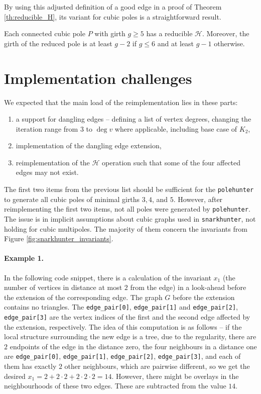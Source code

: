 By using this adjusted definition of a good edge in a proof of Theorem \ref{th:reducible_H}, its variant for cubic poles is a straightforward result.

\begin{corollary}
    Each connected cubic pole $P$ with girth $g\geq 5$ has a reducible $\mathcal H$. Moreover, the girth of the reduced pole is at least $g-2$ if $g\leq 6$ and at least $g-1$ otherwise.
\end{corollary}

\section{Implementation challenges}

We expected that the main load of the reimplementation lies in these parts:
\begin{enumerate}
    \item a support for dangling edges -- defining a list of vertex degrees, changing the iteration range from $3$ to $\deg v$ where applicable, including base case of $K_2$,
    \item implementation of the dangling edge extension,
    \item reimplementation of the $\mathcal H$ operation such that some of the four affected edges may not exist.
\end{enumerate}

The first two items from the previous list should be sufficient for the \texttt{polehunter} to generate all cubic poles of minimal girths $3, 4$, and $5$. However, after reimplementing the first two items, not all poles were generated by \texttt{polehunter}. The issue is in implicit assumptions about cubic graphs used in \texttt{snarkhunter}, not holding for cubic multipoles. The majority of them concern the invariants from Figure \ref{fig:snarkhunter_invariants}.

\paragraph{Example 1.} In the following code snippet, there is a calculation of the invariant $x_1$ (the number of vertices in distance at most $2$ from the edge) in a look-ahead before the extension of the corresponding edge. The graph $G$ before the extension contains no triangles. The \texttt{edge\_pair[0]}, \texttt{edge\_pair[1]} and \texttt{edge\_pair[2]}, \texttt{edge\_pair[3]} are the vertex indices of the first and the second edge affected by the extension, respectively. The idea of this computation is as follows -- if the local structure surrounding the new edge is a tree, due to the regularity, there are $2$ endpoints of the edge in the distance zero, the four neighbours in a distance one are \texttt{edge\_pair[0]}, \texttt{edge\_pair[1]}, \texttt{edge\_pair[2]}, \texttt{edge\_pair[3]}, and each of them has exactly $2$ other neighbours, which are pairwise different, so we get the desired $x_1 = 2 + 2\cdot 2 + 2\cdot 2\cdot 2 = 14$. However, there might be overlays in the neighbourhoods of these two edges. These are subtracted from the value $14$.

